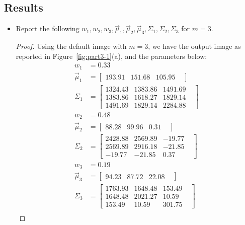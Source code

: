 \documentclass[12pt]{article}
\newcommand{\1}{\mathbf{1}}
\begin{document}
{\subsection{Results}
\begin{itemize}
  \item Report the following  $w_1, w_2, w_3, \vec{\mu}_1, \vec{\mu}_2, \vec{\mu}_3, \Sigma_1, \Sigma_2, \Sigma_3$ for $m=3$.
  \begin{proof}
    Using the default image with $m=3$, we have the output image as reported in Figure~\ref{fig:part3-1}(a), and the parameters below:
      \begin{align*}
w_{1} &= 0.33 \\
\vec{\mu}_{1} &= \begin{bmatrix} 193.91 &  151.68 &  105.95 &  \end{bmatrix} \\
\Sigma_{1} &= \begin{bmatrix} 1324.43 &  1383.86 &  1491.69 &  \\1383.86 &  1618.27 &  1829.14 &  \\1491.69 &  1829.14 &  2284.88 &  \end{bmatrix} \\
w_{2} &= 0.48 \\
\vec{\mu}_{2} &= \begin{bmatrix} 88.28 &  99.96 &  0.31 &  \end{bmatrix} \\
\Sigma_{2} &= \begin{bmatrix} 2428.88 &  2569.89 &  -19.77 &  \\2569.89 &  2916.18 &  -21.85 &  \\-19.77 &  -21.85 &  0.37 &  \end{bmatrix} \\
w_{3} &= 0.19 \\
\vec{\mu}_{3} &= \begin{bmatrix} 94.23 &  87.72 &  22.08 &  \end{bmatrix} \\
\Sigma_{3} &= \begin{bmatrix} 1763.93 &  1648.48 &  153.49 &  \\1648.48 &  2021.27 &  10.59 &  \\153.49 &  10.59 &  301.75 &  \end{bmatrix} \\
\end{align*}



\end{proof}
\end{itemize}}
\end{document}
